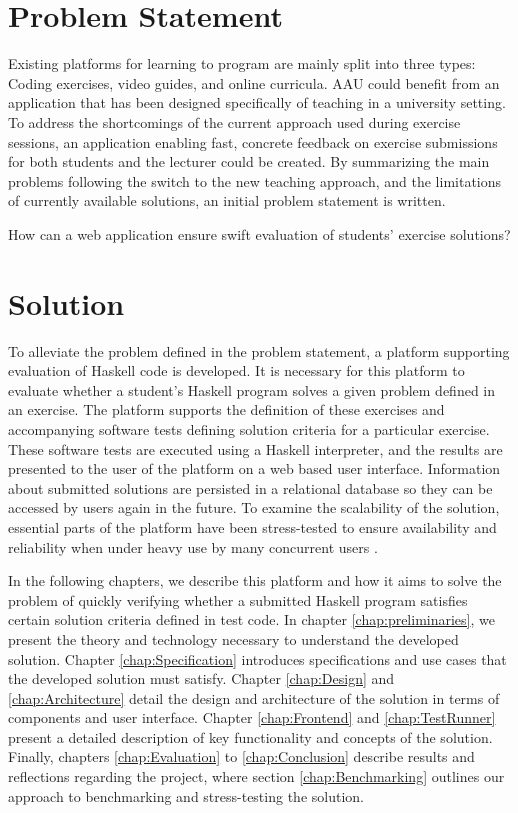 \section{Problem Statement}
Existing platforms for learning to program are mainly split into three types: Coding exercises, video guides, and online curricula.
AAU could benefit from an application that has been designed specifically of teaching in a university setting.
To address the shortcomings of the current approach used during exercise sessions, an application enabling fast, concrete feedback on exercise submissions for both students and the lecturer could be created.
By summarizing the main problems following the switch to the new teaching approach, and the limitations of currently available solutions, an initial problem statement is written.
\begin{displayquote}
    How can a web application ensure swift evaluation of students' exercise solutions?
\end{displayquote}

\section{Solution}
To alleviate the problem defined in the problem statement, a platform supporting evaluation of Haskell code is developed. It is necessary for this platform to evaluate whether a student's Haskell program solves a given problem defined in an exercise. The platform supports the definition of these exercises and accompanying software tests defining solution criteria for a particular exercise. These software tests are executed using a Haskell interpreter, and the results are presented to the user of the platform on a web based user interface.
Information about submitted solutions are persisted in a relational database so they can be accessed by users again in the future.
To examine the scalability of the solution, essential parts of the platform have been stress-tested to ensure availability and reliability when under heavy use by many concurrent users \cite{Sommerville10}.

In the following chapters, we describe this platform and how it aims to solve the problem of quickly verifying whether a submitted Haskell program satisfies certain solution criteria defined in test code.
In chapter \ref{chap:preliminaries}, we present the theory and technology necessary to understand the developed solution.
Chapter \ref{chap:Specification} introduces specifications and use cases that the developed solution must satisfy.
Chapter \ref{chap:Design} and \ref{chap:Architecture} detail the design and architecture of the solution in terms of components and user interface.
Chapter \ref{chap:Frontend} and \ref{chap:TestRunner} present a detailed description of key functionality and concepts of the solution.
Finally, chapters \ref{chap:Evaluation} to \ref{chap:Conclusion} describe results and reflections regarding the project, where section \ref{chap:Benchmarking} outlines our approach to benchmarking and stress-testing the solution.

